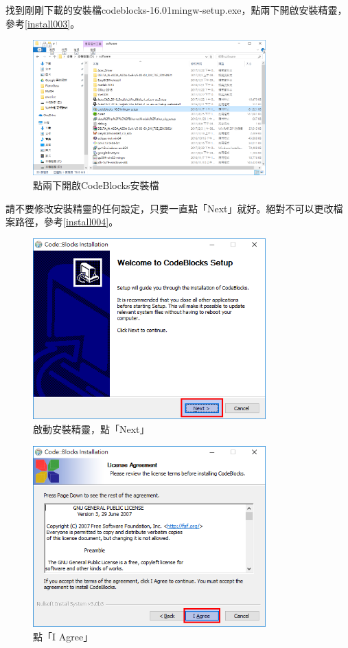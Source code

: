 	找到剛剛下載的安裝檔codeblocks-16.01mingw-setup.exe，點兩下開啟安裝精靈，參考\autoref{install003}。
	\begin{figure}[H]
		\centering
		\includegraphics[width=0.8\textwidth]{fig/install_and_setting/install_003_openEXE}
		\caption{點兩下開啟CodeBlocks安裝檔}
		\label{install003}
	\end{figure}
	
	\newpage
	請不要修改安裝精靈的任何設定，只要一直點「Next」就好。絕對不可以更改檔案路徑，參考\autoref{install004}。
		\begin{figure}[H]
			\centering
			\includegraphics[width=0.8\textwidth]{fig/install_and_setting/install_004_setup01}
			\caption{啟動安裝精靈，點「Next」}
			\label{install004}
		\end{figure}
	
		\begin{figure}[H]
			\centering
			\includegraphics[width=0.8\textwidth]{fig/install_and_setting/install_005_setup02}
			\caption{點「I Agree」}
		\end{figure}
			
